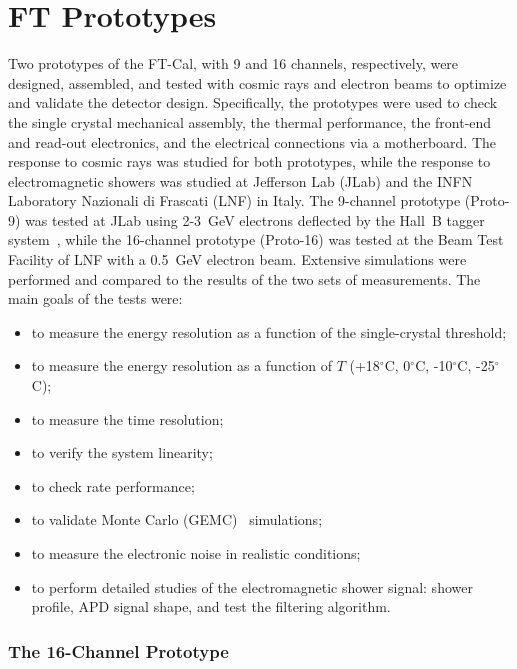 \section{FT Prototypes}

Two prototypes of the FT-Cal, with 9 and 16 channels, respectively, were designed, assembled, and tested with
cosmic rays and electron beams to optimize and validate the detector design. Specifically, the prototypes were
used to check the single crystal mechanical assembly, the thermal performance, the front-end and read-out
electronics, and the electrical connections via a motherboard. The response to cosmic rays was studied for both
prototypes, while the response to electromagnetic showers was studied at Jefferson Lab (JLab) and the INFN
Laboratory Nazionali di Frascati (LNF) in Italy. The 9-channel prototype (Proto-9) was tested at JLab using 2-3~GeV
electrons deflected by the Hall~B tagger system~\cite{beamline},  while the 16-channel prototype (Proto-16) was
tested at the Beam Test Facility of LNF with a 0.5~GeV electron beam. Extensive simulations were performed
and compared to the results of the two sets of measurements. The main goals of the tests were:

\begin{itemize}
\item to measure the energy resolution as a function of the single-crystal threshold;
\item to measure the energy resolution as a function of $T$ (+18$^\circ$C, 0$^\circ$C, -10$^\circ$C, -25$^\circ$C);
\item to measure the time resolution;
\item to verify the system linearity;
\item to check rate performance;
\item to validate Monte Carlo (GEMC)~\cite{gemc} simulations;
\item to measure the electronic noise in realistic conditions;
\item to perform detailed studies of the electromagnetic shower signal: shower profile, APD signal shape, and test
  the filtering algorithm.
\end{itemize}

\subsubsection{The 16-Channel Prototype}
\label{par:proto-16}

